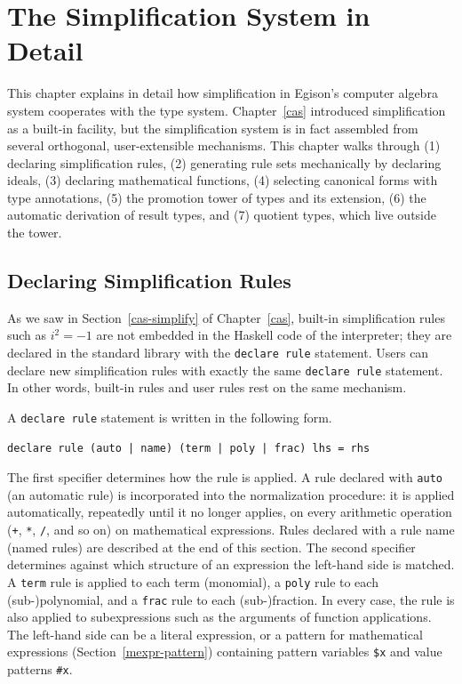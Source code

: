 \chapter{The Simplification System in Detail}\label{casdetail}

This chapter explains in detail how simplification in Egison's computer algebra system cooperates with the type system.
Chapter~\ref{cas} introduced simplification as a built-in facility, but the simplification system is in fact assembled from several orthogonal, user-extensible mechanisms.
This chapter walks through (1) declaring simplification rules, (2) generating rule sets mechanically by declaring ideals, (3) declaring mathematical functions, (4) selecting canonical forms with type annotations, (5) the promotion tower of types and its extension, (6) the automatic derivation of result types, and (7) quotient types, which live outside the tower.

\section{Declaring Simplification Rules}\label{cas-rule}

As we saw in Section~\ref{cas-simplify} of Chapter~\ref{cas}, built-in simplification rules such as $i^2 = -1$ are not embedded in the Haskell code of the interpreter; they are declared in the standard library with the \lstinline{declare rule} statement.
Users can declare new simplification rules with exactly the same \lstinline{declare rule} statement.
In other words, built-in rules and user rules rest on the same mechanism.

A \lstinline{declare rule} statement is written in the following form.
\begin{lstlisting}[language=egison,numbers=none]
declare rule (auto | name) (term | poly | frac) lhs = rhs
\end{lstlisting}
The first specifier determines how the rule is applied.
A rule declared with \lstinline{auto} (an automatic rule) is incorporated into the normalization procedure: it is applied automatically, repeatedly until it no longer applies, on every arithmetic operation (\lstinline{+}, \lstinline{*}, \lstinline{/}, and so on) on mathematical expressions.
Rules declared with a rule name (named rules) are described at the end of this section.
The second specifier determines against which structure of an expression the left-hand side is matched.
A \lstinline{term} rule is applied to each term (monomial), a \lstinline{poly} rule to each (sub-)polynomial, and a \lstinline{frac} rule to each (sub-)fraction.
In every case, the rule is also applied to subexpressions such as the arguments of function applications.
The left-hand side can be a literal expression, or a pattern for mathematical expressions (Section~\ref{mexpr-pattern}) containing pattern variables \lstinline{$x} and value patterns \lstinline{#x}.

